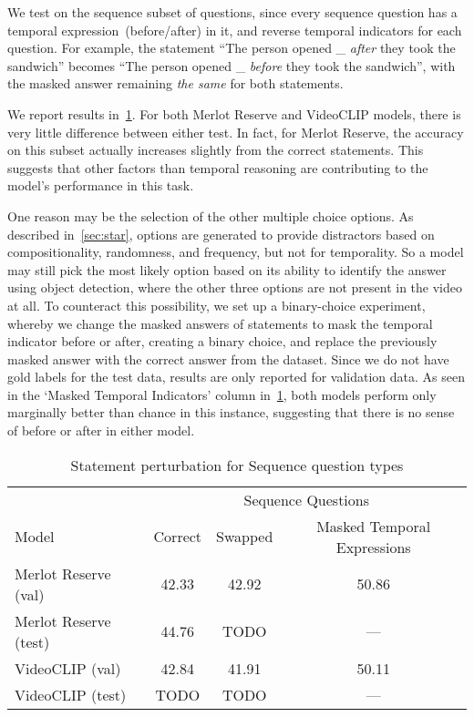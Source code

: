 We test on the sequence subset of questions, since every sequence question has
a temporal expression~(before/after) in it, and reverse temporal indicators for
each question. For example, the statement ``The person opened \_ \emph{after}
they took the sandwich'' becomes ``The person opened \_ \emph{before} they took
the sandwich'', with the masked answer remaining \emph{the same} for both
statements.

We report results in~\cref{tab:swap_star}. For both Merlot Reserve and
VideoCLIP models, there is very little difference between either test. In fact,
for Merlot Reserve, the accuracy on this subset actually increases slightly
from the correct statements. This suggests that other factors than temporal
reasoning are contributing to the model's performance in this task.

One reason may be the selection of the other multiple choice options. As
described in~\cref{sec:star}, options are generated to provide distractors
based on compositionality, randomness, and frequency, but not for temporality.
So a model may still pick the most likely option based on its ability to
identify the answer using object detection, where the other three options are
not present in the video at all. To counteract this possibility, we set up a
binary-choice experiment, whereby we change the masked answers of statements to
mask the temporal indicator before or after, creating a binary choice, and
replace the previously masked answer with the correct answer from the dataset.
Since we do not have gold labels for the test data, results are only reported
for validation data. As seen in the `Masked Temporal Indicators' column
in~\cref{tab:swap_star}, both models perform only marginally better than chance
in this instance, suggesting that there is no sense of before or after in
either model.

\begin{table}[tp]
    \centering
    \caption{Statement perturbation for Sequence question types}
    \label{tab:swap_star}
    \begin{tabular}{lccc}
        \toprule
        \multicolumn{1}{c}{}     & \multicolumn{3}{c}{Sequence Questions} \\
                                   \cmidrule(){2-4}
        Model          & Correct & Swapped & Masked Temporal Expressions\\
        \cmidrule(r){1-1} \cmidrule(){2-3} \cmidrule(l){4-4}
        Merlot Reserve (val)  & 42.33   & 42.92   & 50.86 \\
        Merlot Reserve (test) & 44.76   & TODO   & {---} \\
        VideoCLIP (val)       & 42.84   & 41.91   & 50.11 \\
        VideoCLIP (test)      & TODO   & TODO   &  {---} \\
        \bottomrule
    \end{tabular}
\end{table}

